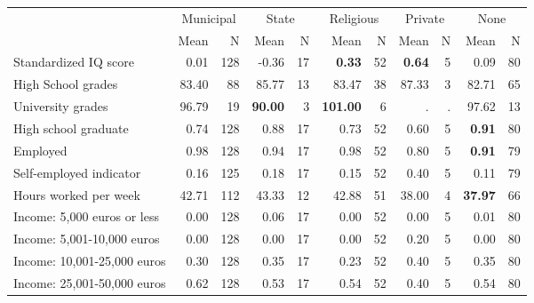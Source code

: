 \begin{tabular}{l r r r r r r r r r r}
\toprule
& \multicolumn{2}{c}{Municipal} & \multicolumn{2}{c}{State} & \multicolumn{2}{c}{Religious} & \multicolumn{2}{c}{Private} & \multicolumn{2}{c}{None} \\
& \scriptsize Mean & \scriptsize N & \scriptsize Mean & \scriptsize N & \scriptsize Mean & \scriptsize N & \scriptsize Mean & \scriptsize N & \scriptsize Mean & \scriptsize N \\
\midrule
Standardized IQ score &      0.01 &       128 &     -0.36 &        17 & \textbf{     0.33} &        52 & \textbf{     0.64} &         5 &      0.09 &        80 \\
High School grades &     83.40 &        88 &     85.77 &        13 &     83.47 &        38 &     87.33 &         3 &     82.71 &        65 \\
University grades &     96.79 &        19 & \textbf{    90.00} &         3 & \textbf{   101.00} &         6 &         . & . &     97.62 &        13 \\
High school graduate &      0.74 &       128 &      0.88 &        17 &      0.73 &        52 &      0.60 &         5 & \textbf{     0.91} &        80 \\
Employed &      0.98 &       128 &      0.94 &        17 &      0.98 &        52 &      0.80 &         5 & \textbf{     0.91} &        79 \\
Self-employed indicator &      0.16 &       125 &      0.18 &        17 &      0.15 &        52 &      0.40 &         5 &      0.11 &        79 \\
Hours worked per week &     42.71 &       112 &     43.33 &        12 &     42.88 &        51 &     38.00 &         4 & \textbf{    37.97} &        66 \\
Income: 5,000 euros or less &      0.00 &       128 &      0.06 &        17 &      0.00 &        52 &      0.00 &         5 &      0.01 &        80 \\
Income: 5,001-10,000 euros &      0.00 &       128 &      0.00 &        17 &      0.00 &        52 &      0.20 &         5 &      0.00 &        80 \\
Income: 10,001-25,000 euros &      0.30 &       128 &      0.35 &        17 &      0.23 &        52 &      0.40 &         5 &      0.35 &        80 \\
Income: 25,001-50,000 euros &      0.62 &       128 &      0.53 &        17 &      0.54 &        52 &      0.40 &         5 &      0.54 &        80 \\

\end{tabular}
